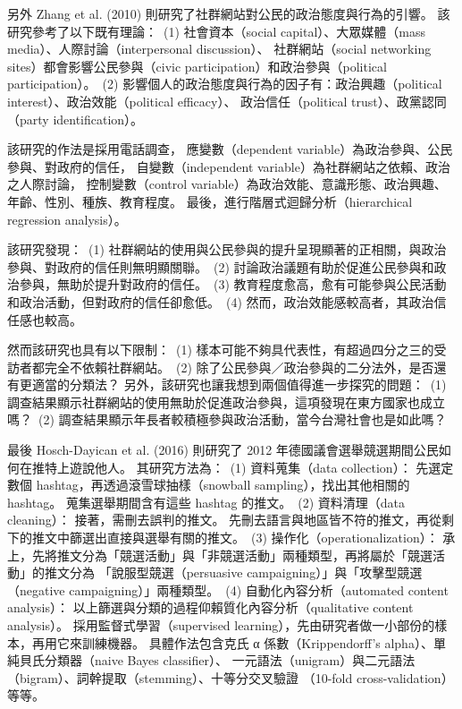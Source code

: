 \documentclass[letterpaper, 10pt, conference]{ieeeconf}   %
\begin{document}
\begin{CJK}{UTF8}{bsmi}
另外 Zhang et al. (2010) 則研究了社群網站對公民的政治態度與行為的引響。\cite{c2} %
該研究參考了以下既有理論：%
\,(1) 社會資本（social capital）、大眾媒體（mass media）、人際討論（interpersonal discussion）、%
社群網站（social networking sites）都會影響公民參與（civic participation）和政治參與（political participation）。%
\,(2) 影響個人的政治態度與行為的因子有：政治興趣（political interest）、政治效能（political efficacy）、%
政治信任（political trust）、政黨認同（party identification）。%

該研究的作法是採用電話調查，%
應變數（dependent variable）為政治參與、公民參與、對政府的信任，%
自變數（independent variable）為社群網站之依賴、政治之人際討論，%
控制變數（control variable）為政治效能、意識形態、政治興趣、年齡、性別、種族、教育程度。%
最後，進行階層式迴歸分析（hierarchical regression analysis）。%

該研究發現：%
\,(1) 社群網站的使用與公民參與的提升呈現顯著的正相關，與政治參與、對政府的信任則無明顯關聯。%
\,(2) 討論政治議題有助於促進公民參與和政治參與，無助於提升對政府的信任。%
\,(3) 教育程度愈高，愈有可能參與公民活動和政治活動，但對政府的信任卻愈低。%
\,(4) 然而，政治效能感較高者，其政治信任感也較高。%

然而該研究也具有以下限制：%
\,(1) 樣本可能不夠具代表性，有超過四分之三的受訪者都完全不依賴社群網站。%
\,(2) 除了公民參與／政治參與的二分法外，是否還有更適當的分類法？%
另外，該研究也讓我想到兩個值得進一步探究的問題：%
\,(1) 調查結果顯示社群網站的使用無助於促進政治參與，這項發現在東方國家也成立嗎？%
\,(2) 調查結果顯示年長者較積極參與政治活動，當今台灣社會也是如此嗎？%

最後 Hosch-Dayican et al. (2016) 則研究了 2012 年德國議會選舉競選期間公民如何在推特上遊說他人。\cite{c3} %
其研究方法為：%
\,(1) 資料蒐集（data collection）：%
先選定數個 hashtag，再透過滾雪球抽樣（snowball sampling），找出其他相關的 hashtag。%
蒐集選舉期間含有這些 hashtag 的推文。%
\,(2) 資料清理（data cleaning）：%
接著，需刪去誤判的推文。%
先刪去語言與地區皆不符的推文，再從剩下的推文中篩選出直接與選舉有關的推文。%
\,(3) 操作化（operationalization）：%
承上，先將推文分為「競選活動」與「非競選活動」兩種類型，再將屬於「競選活動」的推文分為%
「說服型競選（persuasive campaigning）」與「攻擊型競選（negative campaigning）」兩種類型。%
\,(4) 自動化內容分析（automated content analysis）：%
以上篩選與分類的過程仰賴質化內容分析（qualitative content analysis）。%
採用監督式學習（supervised learning），先由研究者做一小部份的樣本，再用它來訓練機器。%
具體作法包含克氏 α 係數（Krippendorff's alpha）、單純貝氏分類器（naive Bayes classifier）、%
一元語法（unigram）與二元語法（bigram）、詞幹提取（stemming）、十等分交叉驗證%
（10-fold cross-validation）等等。%


\end{CJK}
\end{document}
